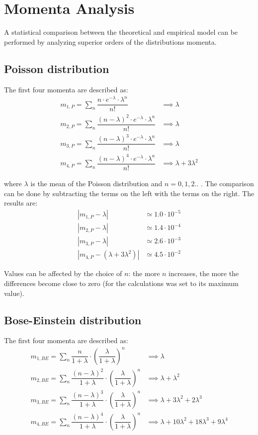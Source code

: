 
\section{Momenta Analysis}
A statistical comparison between the theoretical and empirical model can be performed by analyzing superior orders of the distributions momenta.
\subsection{Poisson distribution}
The first four momenta are described as:
\begin{align*}
m_{1,P}=\sum_{n} \dfrac {n\cdot e^{-\lambda}\cdot \lambda^n}{n!} &\implies \lambda\\
m_{2,P}=\sum_{n} \dfrac {(n-\lambda)^2\cdot e^{-\lambda}\cdot \lambda^n}{n!} &\implies \lambda \\
m_{3,P}=\sum_{n} \dfrac {(n-\lambda)^3\cdot e^{-\lambda}\cdot \lambda^n}{n!} &\implies \lambda \\
m_{4,P}=\sum_{n} \dfrac {(n-\lambda)^4\cdot e^{-\lambda}\cdot \lambda^n}{n!} &\implies \lambda+3\lambda^2 
\end{align*}


where $\lambda$ is the mean of the Poisson distribution and $n=0,1,2..$ . The comparison can be done by subtracting the terms on the left with the terms on the right. The results are:
\begin{align*}
|m_{1,P}-\lambda|& \simeq 1.0\cdot10^{-5} \\
|m_{2,P}-\lambda|& \simeq 1.4\cdot10^{-4} \\
|m_{3,P}-\lambda|& \simeq 2.6\cdot10^{-3} \\
|m_{4,P}-(\lambda+3\lambda^2 )|& \simeq 4.5\cdot10^{-2}
\end{align*}


Values can be affected by the choice of $n$: the more $n$ increases, the more the differences become close to zero (for the calculations was set to its maximum value).

\subsection{Bose-Einstein distribution}
The first four momenta are described as:
\begin{align*}
m_{1,BE}=\sum_n\dfrac{n}{1+\lambda}\cdot\left(\dfrac{\lambda}{1+\lambda}\right)^n &\implies \lambda \\
m_{2,BE}=\sum_n\dfrac{(n-\lambda)^2}{1+\lambda}\cdot\left(\dfrac{\lambda}{1+\lambda}\right)^n &\implies \lambda+\lambda^2 \\
m_{3,BE}=\sum_n\dfrac{(n-\lambda)^3}{1+\lambda}\cdot\left(\dfrac{\lambda}{1+\lambda}\right)^n &\implies \lambda+3\lambda^2+2\lambda^3\\
m_{4,BE}=\sum_n\dfrac{(n-\lambda)^4}{1+\lambda}\cdot\left(\dfrac{\lambda}{1+\lambda}\right)^n &\implies \lambda+10\lambda^2+18\lambda^3+9\lambda^4\\
\end{align*}

